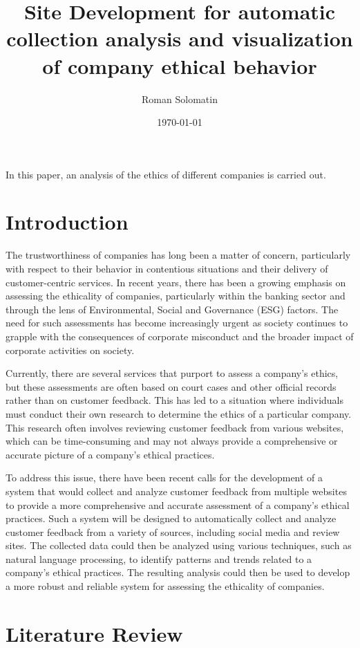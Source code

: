 \documentclass[PI]{ProjectProposal}
\author{Roman Solomatin}
\date{\today}
\title{Site Development for automatic collection analysis and visualization of company ethical behavior}
\begin{document}
\maketitle
In this paper, an analysis of the ethics of different companies is carried out.

\chapter{Introduction}
\label{sec:orgaf2e0c6}
The trustworthiness of companies has long been a matter of concern, particularly with respect to their behavior in contentious situations and their delivery of customer-centric services. In recent years, there has been a growing emphasis on assessing the ethicality of companies\autocites{mure_esg_2021}[][]{miralles-quiros_esg_2019}[][]{climent_ethical_2018}, particularly within the banking sector and through the lens of Environmental, Social and Governance (ESG) factors. The need for such assessments has become increasingly urgent as society continues to grapple with the consequences of corporate misconduct and the broader impact of corporate activities on society.

Currently, there are several services that purport to assess a company's ethics, but these assessments are often based on court cases and other official records rather than on customer feedback. This has led to a situation where individuals must conduct their own research to determine the ethics of a particular company. This research often involves reviewing customer feedback from various websites, which can be time-consuming and may not always provide a comprehensive or accurate picture of a company's ethical practices.

To address this issue, there have been recent calls for the development of a system that would collect and analyze customer feedback from multiple websites to provide a more comprehensive and accurate assessment of a company's ethical practices. Such a system will be designed to automatically collect and analyze customer feedback from a variety of sources, including social media and review sites. The collected data could then be analyzed using various techniques, such as natural language processing, to identify patterns and trends related to a company's ethical practices. The resulting analysis could then be used to develop a more robust and reliable system for assessing the ethicality of companies.
\chapter{Literature Review}
\label{sec:orgb839d60}
\end{document}
